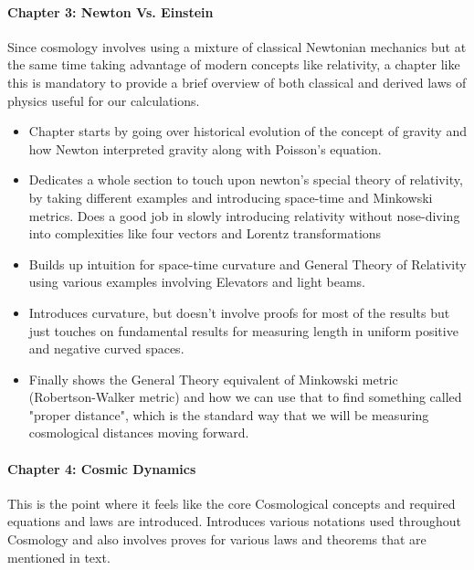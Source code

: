 \documentclass[11pt]{article}
\begin{document}
\paragraph{Chapter 3: Newton Vs. Einstein}

Since cosmology involves using a mixture of classical Newtonian mechanics but at
the same time taking advantage of modern concepts like relativity, a chapter
like this is mandatory to provide a brief overview of both classical and
derived laws of physics useful for our calculations.

\begin{itemize}
	\item Chapter starts by going over historical evolution of the concept
		of gravity and how Newton interpreted gravity along with
		Poisson's equation.
	\item Dedicates a whole section to touch upon newton's special theory of
		relativity, by taking different examples and introducing
		space-time and Minkowski metrics. Does a good job in slowly
		introducing relativity without nose-diving into complexities
		like four vectors and Lorentz transformations
	\item Builds up intuition for space-time curvature and General Theory of
		Relativity using various examples involving Elevators and light
		beams.
	\item Introduces curvature, but doesn't involve proofs for most of the
		results but just touches on fundamental results for measuring
		length in uniform positive and negative curved spaces.
	\item Finally shows the General Theory equivalent of Minkowski metric
		(Robertson-Walker metric) and how we can use that to find
		something called "proper distance", which is the standard way
		that we will be measuring cosmological distances moving forward.
\end{itemize}

\paragraph{Chapter 4: Cosmic Dynamics}

This is the point where it feels like the core Cosmological concepts and
required equations and laws are introduced. Introduces various notations
used throughout Cosmology and also involves proves for various laws and theorems
that are mentioned in text.
\end{document}
